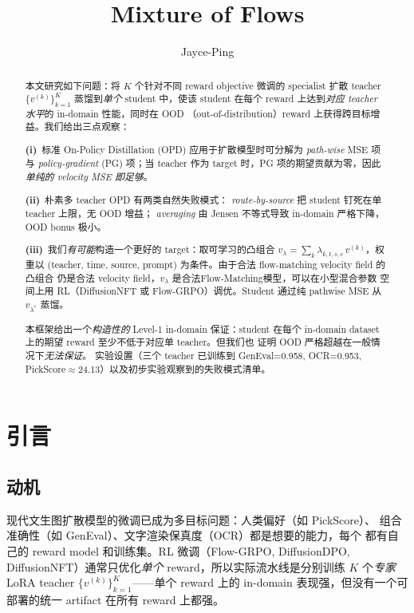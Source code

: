 \documentclass[11pt,a4paper]{article}
\title{\textbf{Mixture of Flows}}
\author{Jayce-Ping}
\date{}
\theoremstyle{definition}
\begin{document}
\maketitle

\begin{abstract}
本文研究如下问题：将 $K$ 个针对不同 reward objective 微调的 specialist
扩散 teacher $\{v^{(k)}\}_{k=1}^K$ 蒸馏到\emph{单个} student 中，使该 student
在每个 reward 上达到\emph{对应 teacher 水平}的 in-domain 性能，同时在 OOD
（out-of-distribution）reward 上获得跨目标增益。我们给出三点观察：

\textbf{(i)}~标准 On-Policy Distillation (OPD) 应用于扩散模型时可分解为
\emph{path-wise} MSE 项与 \emph{policy-gradient} (PG) 项；当 teacher 作为
target 时，PG 项的期望贡献为零，因此\emph{单纯的 velocity MSE 即足够}。

\textbf{(ii)}~朴素多 teacher OPD 有两类自然失败模式：
\emph{route-by-source} 把 student 钉死在单 teacher 上限，无 OOD 增益；
\emph{averaging} 由 Jensen 不等式导致 in-domain 严格下降，OOD bonus 极小。

\textbf{(iii)}~我们\emph{有可能}构造一个更好的 target：取可学习的凸组合
$v_\lambda = \sum_k \lambda_{k,t,s,c}\,v^{(k)}$，权重以 (teacher, time,
source, prompt) 为条件。由于合法 flow-matching velocity field 的凸组合
仍是合法 velocity field，$v_\lambda$ 是合法Flow-Matching模型，可以在小型混合参数
空间上用 RL（DiffusionNFT 或 Flow-GRPO）调优。Student 通过纯 pathwise
MSE 从 $v_{\lambda^*}$ 蒸馏。

本框架给出一个\emph{构造性的} Level-1 in-domain 保证：student 在每个
in-domain dataset 上的期望 reward 至少不低于对应单 teacher。但我们也
证明 OOD 严格超越在一般情况下\emph{无法保证}。
实验设置（三个 teacher 已训练到 GenEval=0.958, OCR=0.953,
PickScore$\approx$24.13）以及初步实验观察到的失败模式清单。
\end{abstract}

\tableofcontents
\newpage

\section{引言}
\label{sec:intro}

\subsection{动机}

现代文生图扩散模型的微调已成为多目标问题：人类偏好（如 PickScore）、
组合准确性（如 GenEval）、文字渲染保真度（OCR）都是想要的能力，每个
都有自己的 reward model 和训练集。RL 微调（Flow-GRPO, DiffusionDPO,
DiffusionNFT）通常只优化\emph{单个} reward，所以实际流水线是分别训练 $K$
个\emph{专家} LoRA teacher $\{v^{(k)}\}_{k=1}^K$——单个 reward 上的
in-domain 表现强，但没有一个可部署的统一 artifact 在所有 reward 上都强。
\end{document}
